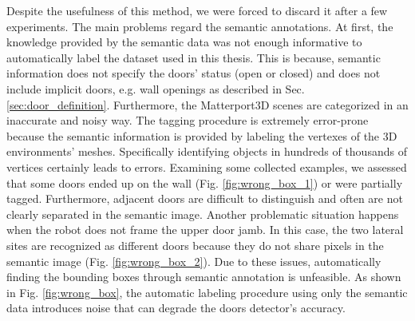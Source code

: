Despite the usefulness of this method, we were forced to discard it after a few experiments. The main problems regard the semantic annotations. At first,  the knowledge provided by the semantic data was not enough informative to automatically label the dataset used in this thesis. This is because, semantic information does not specify the doors' status (open or closed) and does not include implicit doors, e.g. wall openings as described in Sec. \ref{sec:door_definition}. Furthermore, the Matterport3D scenes are categorized in an inaccurate and noisy way. The tagging procedure is extremely error-prone because the semantic information is provided by labeling the vertexes of the 3D environments' meshes. Specifically identifying objects in hundreds of thousands of vertices certainly leads to errors. Examining some collected examples, we assessed that some doors ended up on the wall (Fig. \ref{fig:wrong_box_1}) or were partially tagged. Furthermore, adjacent doors are difficult to distinguish and often are not clearly separated in the semantic image. Another problematic situation happens when the robot does not frame the upper door jamb. In this case, the two lateral sites are recognized as different doors because they do not share pixels in the semantic image (Fig. \ref{fig:wrong_box_2}). Due to these issues, automatically finding the bounding boxes through semantic annotation is unfeasible. As shown in Fig. \ref{fig:wrong_box}, the automatic labeling procedure using only the semantic data introduces noise that can degrade the doors detector's accuracy.

